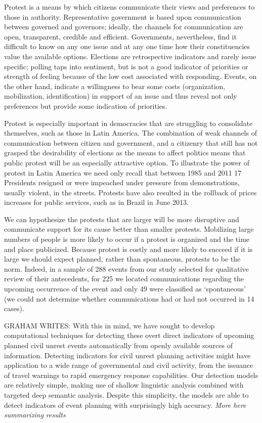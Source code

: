 Protest is a means by which citizens communicate their views and preferences to those in authority. Representative government is based upon communication between governed and governors; ideally, the channels for communication are open, transparent, credible and efficient. Governments, nevertheless, find it difficult to know on any one issue and at any one time how their constituencies value the available options. Elections are retrospective indicators and rarely issue specific; polling taps into sentiment, but is not a good indicator of priorities or strength of feeling because of the low cost associated with responding. Events, on the other hand, indicate a willingness to bear some costs (organization, mobilization, identification) in support of an issue and thus reveal not only preferences but provide some indication of priorities.
 
Protest is especially important in democracies that are struggling to consolidate themselves, such as those in Latin America. The combination of weak channels of communication between citizen and government, and a citizenry that still has not grasped the desirability of elections as the means to affect politics means that public protest will be an especially attractive option. To illustrate the power of protest in Latin America we need only recall that between 1985 and 2011 17 Presidents resigned or were impeached under pressure from demonstrations, usually violent, in the streets. Protests have also resulted in the rollback of prices increases for public services, such as in Brazil in June 2013.
 
We can hypothesize the protests that are larger will be more disruptive and communicate support for its cause better than smaller protests. Mobilizing large numbers of people is more likely to occur if a protest is organized and the time and place publicized. Because protest is costly and more likely to succeed if it is large we should expect planned, rather than spontaneous, protests to be the norm. Indeed, in a sample of 288 events from our study selected for qualitative review of their antecedents, for 225 we located communications regarding the upcoming occurrence of the event and only 49 were classified as ‘spontaneous’ (we could not determine whether communications had or had not occurred in 14 cases).

GRAHAM WRITES: With this in mind, we have sought to develop
computational techniques for detecting these overt direct indicators
of upcoming planned civil unrest events automatically from openly
available sources of information.  Detecting indicators for civil
unrest planning activities might have application to a wide range of
governmental and civil activity, from the issuance of travel warnings
to rapid emergency response capabilities.  Our detection models are
relatively simple, making use of shallow linguistic analysis combined
with targeted deep semantic analysis.  Despite this simplicity, the models are able to
detect indicators of event planning with surprisingly high
accuracy. {\em More here summarizing results}
